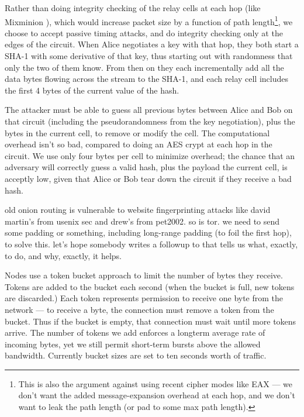 \documentclass[times,10pt,twocolumn]{article}
\begin{document}
Rather than doing integrity checking of the relay cells at each hop
(like Mixminion \cite{minion-design}), which would increase packet size
by a function of path length\footnote{This is also the argument against
using recent cipher modes like EAX \cite{eax} --- we don't want the added
message-expansion overhead at each hop, and we don't want to leak the path
length (or pad to some max path length).}, we choose to accept passive
timing attacks, and do integrity
checking only at the edges of the circuit. When Alice negotiates a key
with that hop, they both start a SHA-1 with some derivative of that key,
thus starting out with randomness that only the two of them know. From
then on they each incrementally add all the data bytes flowing across
the stream to the SHA-1, and each relay cell includes the first 4 bytes
of the current value of the hash. 

The attacker must be able to guess all previous bytes between Alice
and Bob on that circuit (including the pseudorandomness from the key
negotiation), plus the bytes in the current cell, to remove or modify the
cell. The computational overhead isn't so bad, compared to doing an AES
crypt at each hop in the circuit. We use only four bytes per cell to
minimize overhead; the chance that an adversary will correctly guess a
valid hash, plus the payload the current cell, is acceptly low, given
that Alice or Bob tear down the circuit if they receive a bad hash.



old onion routing is vulnerable to website fingerprinting attacks like
david martin's from usenix sec and drew's from pet2002. so is tor. we
need to send some padding or something, including long-range padding
(to foil the first hop), to solve this. let's hope somebody writes
a followup to \cite{defensive-dropping} that tells us what, exactly,
to do, and why, exactly, it helps.


Nodes use a token bucket approach \cite{foo} to limit the number of
bytes they receive. Tokens are added to the bucket each second (when
the bucket is full, new tokens are discarded.) Each token represents
permission to receive one byte from the network --- to receive a byte,
the connection must remove a token from the bucket. Thus if the bucket
is empty, that connection must wait until more tokens arrive. The number
of tokens we add enforces a longterm average rate of incoming bytes, yet
we still permit short-term bursts above the allowed bandwidth. Currently
bucket sizes are set to ten seconds worth of traffic.
\end{document}
